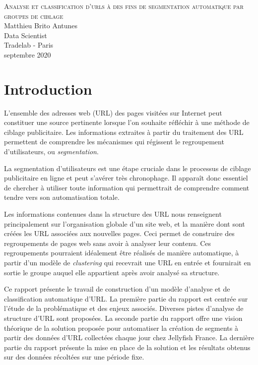 \documentclass[11pt, a4paper]{article}
\begin{document}
	
\begin{titlepage}
\centering
\LARGE{\textsc{Analyse et classification d'urls à des fins de segmentation automatique par groupes de ciblage}}\\
\vfill
\large Matthieu Brito Antunes\\
\large Data Scientist\\
\large Tradelab - Paris\\
\large septembre 2020\\
\end{titlepage}

\newpage
\tableofcontents
\thispagestyle{empty}
\newpage
\listoffigures
\thispagestyle{empty}

\newpage
{}

\section{Introduction}
\label{sec:intro}

L'ensemble des adresses web (URL) des pages visitées sur Internet peut constituer une source pertinente lorsque l'on souhaite réfléchir à une méthode de ciblage publicitaire. Les informations extraites à partir du traitement des URL permettent de comprendre les mécanismes qui régissent le regroupement d'utilisateurs, ou \textit{segmentation}. 

La segmentation d'utilisateurs est une étape cruciale dans le processus de ciblage publicitaire en ligne et peut s'avérer très chronophage. Il apparaît donc essentiel de chercher à utiliser toute information qui permettrait de comprendre comment tendre vers son automatisation totale.

Les informations contenues dans la structure des URL nous renseignent principalement sur l'organisation globale d'un site web, et la manière dont sont créées les URL associées aux nouvelles pages. Ceci permet de construire des regroupements de pages web sans avoir à analyser leur contenu. Ces regroupements pourraient idéalement être réalisés de manière automatique, à partir d'un modèle de \textit{clustering} qui recevrait une URL en entrée et fournirait en sortie le groupe auquel elle appartient après avoir analysé sa structure.

Ce rapport présente le travail de construction d'un modèle d'analyse et de classification automatique d'URL. La première partie du rapport est centrée sur l'étude de la problématique et des enjeux associés. Diverses pistes d'analyse de structure d'URL sont proposées. La seconde partie du rapport offre une vision théorique de la solution proposée pour automatiser la création de segments à partir des données d'URL collectées chaque jour chez Jellyfish France. La dernière partie du rapport présente la mise en place de la solution et les résultats obtenus sur des données récoltées sur une période fixe.
\end{document}
